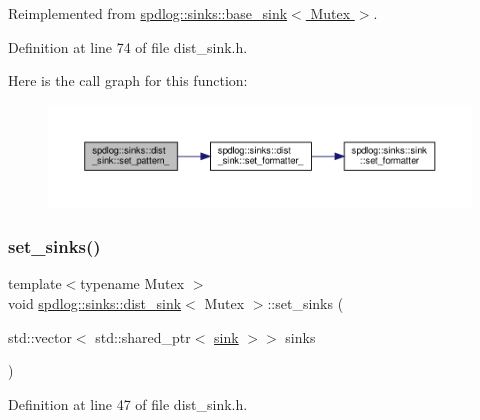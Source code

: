 Reimplemented from \hyperlink{classspdlog_1_1sinks_1_1base__sink_a56bc5fc8e03dc0aeb6679856ffee7fb4}{spdlog\+::sinks\+::base\+\_\+sink$<$ Mutex $>$}.



Definition at line 74 of file dist\+\_\+sink.\+h.

Here is the call graph for this function\+:
\nopagebreak
\begin{figure}[H]
\begin{center}
\leavevmode
\includegraphics[width=350pt]{classspdlog_1_1sinks_1_1dist__sink_a6f77a1e2f45ed85ee8ed554cf7442d4e_cgraph}
\end{center}
\end{figure}
\mbox{\label{classspdlog_1_1sinks_1_1dist__sink_aa0e154cef03e368fefaa7bc845d682a1}} 
\subsubsection{\texorpdfstring{set\+\_\+sinks()}{set\_sinks()}}
{\footnotesize\ttfamily template$<$typename Mutex $>$ \\
void \hyperlink{classspdlog_1_1sinks_1_1dist__sink}{spdlog\+::sinks\+::dist\+\_\+sink}$<$ Mutex $>$\+::set\+\_\+sinks (\begin{DoxyParamCaption}\item[{std\+::vector$<$ std\+::shared\+\_\+ptr$<$ \hyperlink{classspdlog_1_1sinks_1_1sink}{sink} $>$$>$}]{sinks }\end{DoxyParamCaption})\hspace{0.3cm}{\ttfamily [inline]}}



Definition at line 47 of file dist\+\_\+sink.\+h.

\mbox{\label{classspdlog_1_1sinks_1_1dist__sink_a516ef929a8cd73df2ead2e0086e04607}} 
